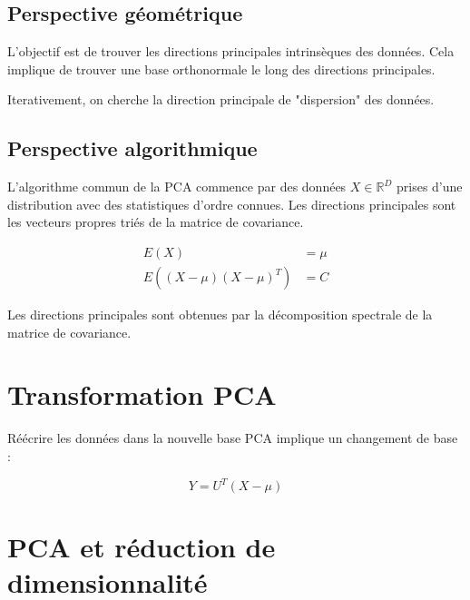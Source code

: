 \documentclass[12pt]{article}
\begin{document}
\subsection{Perspective géométrique}

L'objectif est de trouver les directions principales intrinsèques des données. Cela implique de trouver une base orthonormale le long des directions principales.


\begin{tcolorbox}[title={Intuition}]
Iterativement, on cherche la direction principale de "dispersion" des données.
\end{tcolorbox}

\subsection{Perspective algorithmique}

L'algorithme commun de la PCA commence par des données $X \in \mathbb{R}^D$ prises d'une distribution avec des statistiques d'ordre connues. Les directions principales sont les vecteurs propres triés de la matrice de covariance.

\begin{align}
E(X) &= \mu \\
E((X - \mu)(X - \mu)^T) &= C
\end{align}

\begin{tcolorbox}[title={À retenir}]
Les directions principales sont obtenues par la décomposition spectrale de la matrice de covariance.
\end{tcolorbox}

\section{Transformation PCA}

Réécrire les données dans la nouvelle base PCA implique un changement de base :

\begin{equation}
Y = U^T (X - \mu)
\end{equation}


\section{PCA et réduction de dimensionnalité}
\end{document}
